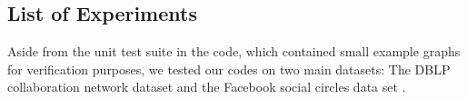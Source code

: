 \documentclass[11pt]{article}
\begin{document}
\subsection{List of Experiments}

Aside from the unit test suite in the code, which contained small example graphs
for verification purposes, we tested our codes on two main datasets: The DBLP
collaboration network dataset and the Facebook social circles data set
\cite{snapnets}.







\newpage



 

\end{document}
